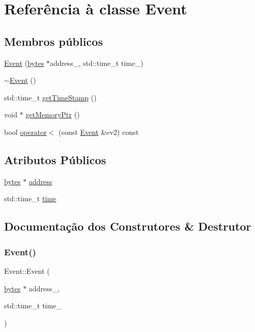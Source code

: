 \hypertarget{classEvent}{}\section{Referência à classe Event}
\label{classEvent}
\subsection*{Membros públicos}
\begin{DoxyCompactItemize}
\item 
\hyperlink{classEvent_ae4b2efb597b48fb229222bd8fd5630ac}{Event} (\hyperlink{storagepooltest_8cpp_a9192c6634956b334d70312524e15a909}{bytes} $\ast$address\+\_\+, std\+::time\+\_\+t time\+\_\+)
\item 
\hyperlink{classEvent_a7704ec01ce91e673885792054214b3d2}{$\sim$\+Event} ()
\item 
std\+::time\+\_\+t \hyperlink{classEvent_a10f30e1a322839fe772a6533d8681c4f}{get\+Time\+Stamp} ()
\item 
void $\ast$ \hyperlink{classEvent_ad251fb8313c6697932445d151c0fa0e2}{get\+Memory\+Ptr} ()
\item 
bool \hyperlink{classEvent_adc997c0b38105e44e659bcd339699bd8}{operator$<$} (const \hyperlink{classEvent}{Event} \&ev2) const
\end{DoxyCompactItemize}
\subsection*{Atributos Públicos}
\begin{DoxyCompactItemize}
\item 
\hyperlink{storagepooltest_8cpp_a9192c6634956b334d70312524e15a909}{bytes} $\ast$ \hyperlink{classEvent_ab97f39d1ca773c8756d319bf8acad6f4}{address}
\item 
std\+::time\+\_\+t \hyperlink{classEvent_a3f96ab977c7b3b16edf59e8f96193ac0}{time}
\end{DoxyCompactItemize}


\subsection{Documentação dos Construtores \& Destrutor}
\mbox{\label{classEvent_ae4b2efb597b48fb229222bd8fd5630ac}} 
\subsubsection{\texorpdfstring{Event()}{Event()}}
{\footnotesize\ttfamily Event\+::\+Event (\begin{DoxyParamCaption}\item[{\hyperlink{storagepooltest_8cpp_a9192c6634956b334d70312524e15a909}{bytes} $\ast$}]{address\+\_\+,  }\item[{std\+::time\+\_\+t}]{time\+\_\+ }\end{DoxyParamCaption})\hspace{0.3cm}{\ttfamily [inline]}}

